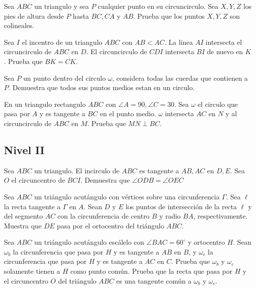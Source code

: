 \documentclass[11pt]{scrartcl}
\newcommand{\thmdifficulty}{0}
\newcommand{\problemdiff}[1]{\renewcommand{\thmdifficulty}{#1}}
\begin{document}
\problemdiff{2}
\begin{problem}  
    Sea $ABC$ un triangulo y sea $P$ cualquier punto en su circuncirculo. Sea $X,Y,Z$ los pies de altura desde $P$ hasta $BC,CA$ y $AB$. Prueba que los puntos $X,Y,Z$ son colineales.
\end{problem}

\problemdiff{2}
\begin{problem}
    Sea $I$ el incentro de un triangulo $ABC$ con $AB<AC$. La linea $AI$ intersecta el circuncirculo de $ABC$ en $D$. El circuncirculo de $CDI$ intersecta $BI$ de nuevo en $K$. Prueba que $BK=CK$.
\end{problem}

\problemdiff{2}
\begin{problem}
    Sea $P$ un punto dentro del circulo $\omega$, considera todas las cuerdas que contienen a $P$. Demuestra que todos sus puntos medios estan en un circulo.
\end{problem}


\problemdiff{2.5}
\begin{problem}
    En un triangulo rectangulo $ABC$ con $\angle A=90, \angle C=30$. Sea $\omega$ el circulo que pasa por $A$ y es tangente a $BC$ en el punto medio. $\omega$ intersecta $AC$ en $N$ y al circuncirculo de $ABC$ en $M$. Prueba que $MN \perp BC$.
\end{problem}

\subsection{Nivel II}

\problemdiff{3}
\begin{problem}
    Sea $ABC$ un triangulo. El incirculo de $ABC$ es tangente a $AB, AC$ en $D,E$. Sea $O$ el circuncentro de $BCI$. Demuestra que $\angle ODB=\angle OEC$
\end{problem}

\problemdiff{3}
\begin{problem}%
    Sea $ABC$ un triángulo acutángulo con vértices sobre una circunferencia $\Gamma$. Sea $\ell$ la recta
tangente a $\Gamma$ en $A$. Sean $D$ y $E$ los puntos de intersección de la recta $\ell$ y del segmento $AC$ con la circunferencia de centro $B$ y radio $BA$, respectivamente. Muestra que $DE$ pasa por el ortocentro del triángulo $ABC$.
    
\end{problem}

\problemdiff{3}
\begin{problem}%
    Sea $ABC$ un triángulo acutángulo escálelo con $\angle BAC=60^{\circ}$ y ortocentro $H$. Sean $\omega_b$ la circunferencia que pasa por $H$ y es tangente a $AB$ en $B$, y $\omega_c$ la circunferencia que pasa por $H$ y es tangente a $AC$ en $C$. Prueba que $\omega_b$ y $\omega_c$ solamente tienen a $H$ como punto común.  Prueba que la recta que pasa por $H$ y el circuncentro $O$ del triángulo $ABC$ es una tangente común a $\omega_b$ y $\omega_c$.
 
\end{problem}
\end{document}
